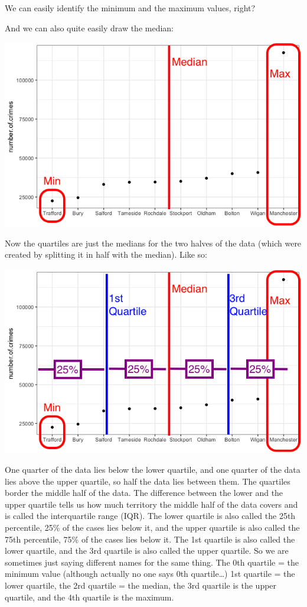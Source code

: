 \documentclass[
]{book}
\begin{document}
We can easily identify the minimum and the maximum values, right?

And we can also quite easily draw the median:

\includegraphics{imgs/crimes_dotplot.png}

Now the quartiles are just the medians for the two halves of the data (which were created by splitting it in half with the median). Like so:

\includegraphics{imgs/crimes_dotplot_quart.png}

One quarter of the data lies below the lower quartile, and one quarter of the data lies above the upper quartile, so half the data lies between them. The quartiles border the middle half of the data. The difference between the lower and the upper quartile tells us how much territory the middle half of the data covers and is called the interquartile range (IQR). The lower quartile is also called the 25th percentile, 25\% of the cases lies below it, and the upper quartile is also called the 75th percentile, 75\% of the cases lies below it. The 1st quartile is also called the lower quartile, and the 3rd quartile is also called the upper quartile. So we are sometimes just saying different names for the same thing. The 0th quartile = the minimum value (although actually no one says 0th quartile\ldots) 1st quartile = the lower quartile, the 2rd quartile = the median, the 3rd quartile is the upper quartile, and the 4th quartile is the maximum.
\end{document}

